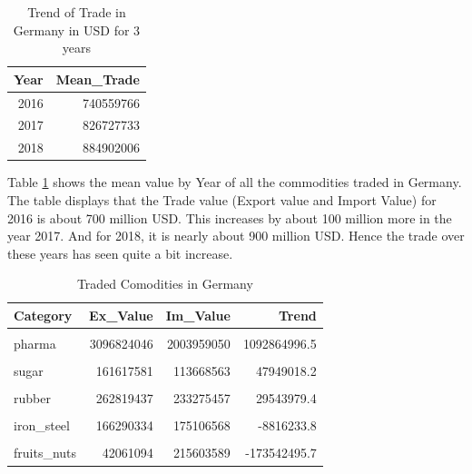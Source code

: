\documentclass[11pt,a4paper,]{article}
\begin{document}
\begin{table}[!h]

\caption{\label{tab:germanytrend}Trend of Trade in Germany in USD for 3 years}
\centering
\begin{tabular}[t]{r|r}
\hline
Year & Mean\_Trade\\
\hline
2016 & 740559766\\
\hline
2017 & 826727733\\
\hline
2018 & 884902006\\
\hline
\end{tabular}
\end{table}

Table \ref{tab:germanytrend} shows the mean value by Year of all the commodities traded in Germany. The table displays that the Trade value (Export value and Import Value) for 2016 is about 700 million USD. This increases by about 100 million more in the year 2017. And for 2018, it is nearly about 900 million USD. Hence the trade over these years has seen quite a bit increase.

\begin{table}[!h]

\caption{\label{tab:germanycomo}Traded Comodities in Germany}
\centering
\begin{tabular}[t]{l|r|r|r}
\hline
Category & Ex\_Value & Im\_Value & Trend\\
\hline
\cellcolor{gray!6}{cars} & \cellcolor{gray!6}{3556599614} & \cellcolor{gray!6}{1659647794} & \cellcolor{gray!6}{1896951819.6}\\
\hline
pharma & 3096824046 & 2003959050 & 1092864996.5\\
\hline
\cellcolor{gray!6}{tobacco} & \cellcolor{gray!6}{502254364} & \cellcolor{gray!6}{271617658} & \cellcolor{gray!6}{230636705.9}\\
\hline
sugar & 161617581 & 113668563 & 47949018.2\\
\hline
\cellcolor{gray!6}{wheat} & \cellcolor{gray!6}{61969300} & \cellcolor{gray!6}{22357247} & \cellcolor{gray!6}{39612053.3}\\
\hline
rubber & 262819437 & 233275457 & 29543979.4\\
\hline
\cellcolor{gray!6}{cotton} & \cellcolor{gray!6}{7928467} & \cellcolor{gray!6}{8088379} & \cellcolor{gray!6}{-159911.7}\\
\hline
iron\_steel & 166290334 & 175106568 & -8816233.8\\
\hline
\cellcolor{gray!6}{coffee} & \cellcolor{gray!6}{112882680} & \cellcolor{gray!6}{153919437} & \cellcolor{gray!6}{-41036756.6}\\
\hline
fruits\_nuts & 42061094 & 215603589 & -173542495.7\\
\hline
\end{tabular}
\end{table}
\end{document}
